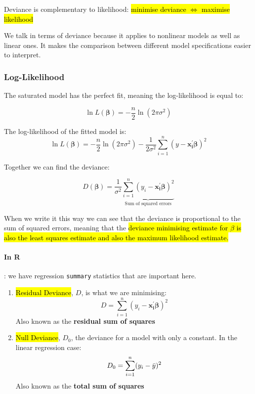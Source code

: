 \documentclass[11pt]{article}
\begin{document}
\begin{note}
    Deviance is complementary to likelihood: \hl{minimise deviance $\Leftrightarrow$ maximise likelihood}
\end{note}

\begin{note}
    We talk in terms of deviance because it applies to nonlinear models as well as linear ones. It makes the comparison between different model specifications easier to interpret.
\end{note}

\subsubsection{Log-Likelihood}

The saturated model has the perfect fit, meaning the log-likelihood is equal to:

\begin{equation*}
    \ln L(\bm{\beta}) = -\dfrac{n}{2}\ln(2\pi\sigma^2)
\end{equation*}

The log-likelihood of the fitted model is:
\begin{equation}
    \label{eq: log likelihood fitted}
    \ln L(\bm{\beta}) = -\dfrac{n}{2}\ln(2\pi\sigma^2) - \dfrac{1}{2\sigma^2}\sum_{i=1}^n(y - \mathbf{x_i^\prime}\bm{\beta})^2
\end{equation}

Together we can find the deviance:

\begin{equation}
    D(\bm{\beta}) = \dfrac{1}{\sigma^2}\underbrace{\sum_{i=1}^n (y_i - \mathbf{x_i^\prime}\bm{\beta})^2}_{\text{Sum of squared errors}}
\end{equation}

When we write it this way we can see that the deviance is proportional to the sum of squared errors, meaning that the \hl{deviance minimising estimate for $\beta$ is also the least squares estimate and also the maximum likelihood estimate.}

\paragraph{In R}: we have regression \lstinline{summary} statistics that are important here.
\begin{enumerate}
    \item \hl{Residual Deviance}, $D$, is what we are minimising:
    \begin{equation*}
        D = \sum_{i=1}^n(y_i - \mathbf{x_i^\prime}\bm{\beta})^2
    \end{equation*}
    Also known as the \textbf{residual sum of squares}
    \item \hl{Null Deviance}, $D_0$, the deviance for a model with only a constant. In the linear regression case:
    \begin{equation*}
        D_0 = \sum_{i=1}^n (y_i - \Bar{y})^2
    \end{equation*}
    Also known as the \textbf{total sum of squares}
\end{enumerate}
\end{document}
